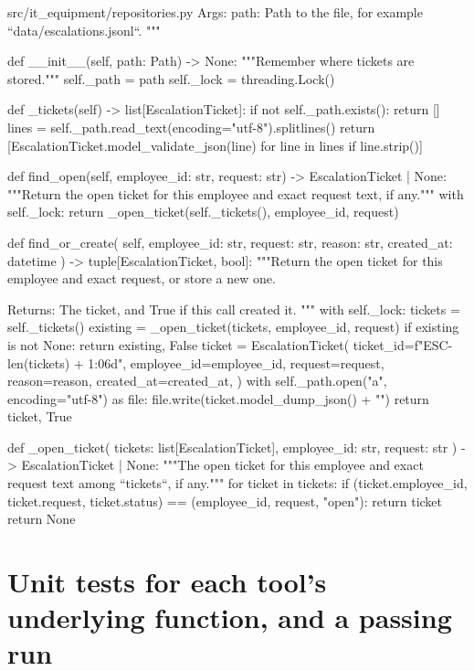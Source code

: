 \documentclass[11pt,letterpaper]{article}
\renewcommand{\_}{\textunderscore\allowbreak}
\begin{document}
\begin{codebox}{src/it_equipment/repositories.py}
    Args:
        path: Path to the file, for example ``data/escalations.jsonl``.
    """

    def __init__(self, path: Path) -> None:
        """Remember where tickets are stored."""
        self._path = path
        self._lock = threading.Lock()

    def _tickets(self) -> list[EscalationTicket]:
        if not self._path.exists():
            return []
        lines = self._path.read_text(encoding="utf-8").splitlines()
        return [EscalationTicket.model_validate_json(line) for line in lines if line.strip()]

    def find_open(self, employee_id: str, request: str) -> EscalationTicket | None:
        """Return the open ticket for this employee and exact request text, if any."""
        with self._lock:
            return _open_ticket(self._tickets(), employee_id, request)

    def find_or_create(
        self, employee_id: str, request: str, reason: str, created_at: datetime
    ) -> tuple[EscalationTicket, bool]:
        """Return the open ticket for this employee and exact request, or store a new one.

        Returns:
            The ticket, and True if this call created it.
        """
        with self._lock:
            tickets = self._tickets()
            existing = _open_ticket(tickets, employee_id, request)
            if existing is not None:
                return existing, False
            ticket = EscalationTicket(
                ticket_id=f"ESC-{len(tickets) + 1:06d}",
                employee_id=employee_id,
                request=request,
                reason=reason,
                created_at=created_at,
            )
            with self._path.open("a", encoding="utf-8") as file:
                file.write(ticket.model_dump_json() + "\n")
            return ticket, True


def _open_ticket(
    tickets: list[EscalationTicket], employee_id: str, request: str
) -> EscalationTicket | None:
    """The open ticket for this employee and exact request text among ``tickets``, if any."""
    for ticket in tickets:
        if (ticket.employee_id, ticket.request, ticket.status) == (employee_id, request, "open"):
            return ticket
    return None
\end{codebox}

\newpage
\section{Unit tests for each tool's underlying function, and a passing run}
\end{document}
